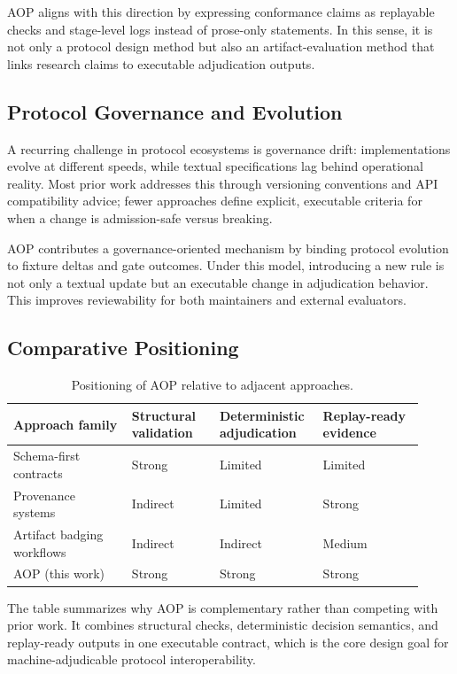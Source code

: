 \documentclass[10pt,conference]{IEEEtran}
\begin{document}
AOP aligns with this direction by expressing conformance claims as replayable
checks and stage-level logs instead of prose-only statements. In this sense, it
is not only a protocol design method but also an artifact-evaluation method
that links research claims to executable adjudication outputs.

\subsection{Protocol Governance and Evolution}

A recurring challenge in protocol ecosystems is governance drift: implementations
evolve at different speeds, while textual specifications lag behind operational
reality. Most prior work addresses this through versioning conventions and API
compatibility advice; fewer approaches define explicit, executable criteria for
when a change is admission-safe versus breaking.

AOP contributes a governance-oriented mechanism by binding protocol evolution to
fixture deltas and gate outcomes. Under this model, introducing a new rule is
not only a textual update but an executable change in adjudication behavior.
This improves reviewability for both maintainers and external evaluators.

\subsection{Comparative Positioning}

\begin{table}[t]
\centering
\caption{Positioning of AOP relative to adjacent approaches.}
{\small
\setlength{\tabcolsep}{3pt}
\begin{tabular}{@{}p{0.27\linewidth}p{0.20\linewidth}p{0.22\linewidth}p{0.23\linewidth}@{}}
\toprule
Approach family & Structural validation & Deterministic adjudication & Replay-ready evidence \\
\midrule
Schema-first contracts & Strong & Limited & Limited \\
Provenance systems & Indirect & Limited & Strong \\
Artifact badging workflows & Indirect & Indirect & Medium \\
AOP (this work) & Strong & Strong & Strong \\
\bottomrule
\end{tabular}
}
\end{table}

The table summarizes why AOP is complementary rather than competing with prior
work. It combines structural checks, deterministic decision semantics, and
replay-ready outputs in one executable contract, which is the core design goal
for machine-adjudicable protocol interoperability.
\end{document}

